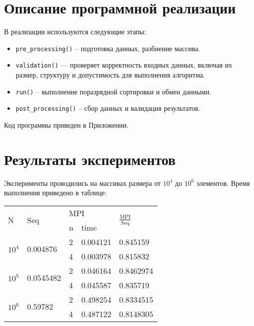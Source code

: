 \documentclass[12pt]{article}
\begin{document}
\section*{Описание программной реализации}

В реализации используются следующие этапы:
\begin{itemize}
    \item \texttt{pre\_processing()} – подготовка данных, разбиение массива.
    \item \texttt{validation()} — проверяет корректность входных данных, включая их размер, структуру и допустимость для выполнения алгоритма.
    \item \texttt{run()} – выполнение поразрядной сортировки и обмен данными.
    \item \texttt{post\_processing()} – сбор данных и валидация результатов.
\end{itemize}

Код программы приведен в Приложении.

\newpage
\section*{Результаты экспериментов}

Эксперименты проводились на массивах размера от $10^4$ до $10^6$ элементов. Время выполнения приведено в таблице:

\begin{table}[H]
\begin{tabular}{|l|l|ll|l|}
\hline
\multirow{2}{*}{N}      & \multirow{2}{*}{Seq}       & \multicolumn{2}{l|}{MPI}          & \multirow{2}{*}{$\frac{\text{MPI}}{\text{Seq}}$} \\ \cline{3-4}
                        &                            & \multicolumn{1}{l|}{n} & time     &                           \\ \hline
\multirow{2}{*}{$10^4$} & \multirow{2}{*}{0.004876}  & \multicolumn{1}{l|}{2} & 0.004121 & 0.845159                  \\ \cline{3-5} 
                        &                            & \multicolumn{1}{l|}{4} & 0.003978 & 0.815832                  \\ \hline
\multirow{2}{*}{$10^5$} & \multirow{2}{*}{0.0545482}  & \multicolumn{1}{l|}{2} & 0.046164 & 0.8462974                  \\ \cline{3-5} 
                        &                            & \multicolumn{1}{l|}{4} & 0.045587 & 0.835719                  \\ \hline
\multirow{2}{*}{$10^6$} & \multirow{2}{*}{0.59782}  & \multicolumn{1}{l|}{2} & 0.498254 & 0.8334515                  \\ \cline{3-5} 
                        &                            & \multicolumn{1}{l|}{4} & 0.487122 & 0.8148305                  \\ \hline
\end{tabular}
\end{table}
\end{document}
